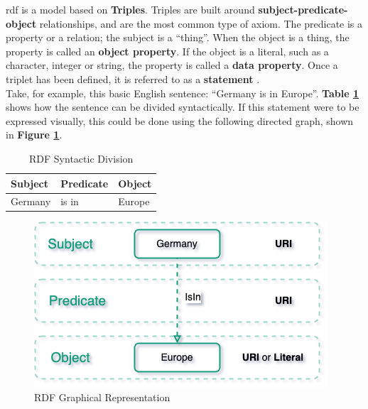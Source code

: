     \acrshort{rdf} is a model based on \textbf{Triples}. Triples are built around \textbf{subject-predicate-object} relationships, and are the most common type of axiom. The predicate is a property or a relation; the subject is a “thing”. When the object is a thing, the property is called an \textbf{object property}. If the object is a literal, such as a character, integer or string, the property is called a \textbf{data property}. Once a triplet has been defined, it is referred to as a \textbf{statement} \cite{noy2001ontology}.\\

    Take, for example, this basic English sentence: “Germany is in Europe”. \textbf{Table \ref{tab:rdf-example}} shows how the sentence can be divided syntactically. If this statement were to be expressed visually, this could be done using the following directed graph, shown in \textbf{Figure \ref{fig:rdf-example}}.\\
    
    \begin{table}[h]
        \centering
	    \begin{tabular}{ | m{4cm} | m{4cm} | m{4cm} | }
            \hline
            \rowcolor{teal!30} \textbf{Subject} & \textbf{Predicate} & \textbf{Object} \\
            
            \hline
            Germany  & is in & Europe\\
            
            \hline
        \end{tabular}
        \caption{\label{tab:rdf-example} RDF Syntactic Division}
        \end{table}
        
    \begin{figure}[h]
        \centering
        \includegraphics[scale=0.6]{images/Foundation-RDF Example.drawio.png}
        \caption{\label{fig:rdf-example}  RDF Graphical Representation}
    \end{figure}

